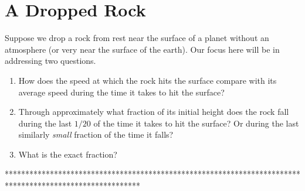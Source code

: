 \documentclass{ximera}
\begin{document}
\section{A Dropped Rock}
Suppose we drop a rock from rest near the surface of a planet without an atmosphere (or very near the surface of the earth). Our focus here will be in addressing two questions.

\begin{question} \label{Q54rghgeyghhg}

\begin{enumerate}
\item How does the speed at which the rock hits the surface compare with its average speed during the time it takes to hit the surface?

\item Through approximately what fraction of its initial height does the rock fall during the last $1/20$ of the time it takes to hit the surface? Or during the  last similarly \emph{small} fraction of the time it falls? 
\item What is the exact fraction? 
\end{enumerate}
\end{question}



\iffalse

*********************************************************************************************************
\end{document}
